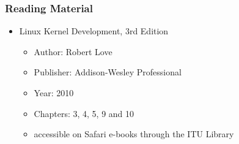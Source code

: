 \documentclass[dvipsnames]{beamer}
\begin{document}
\begin{frame}
  \frametitle{Reading Material}
  \begin{itemize}
    \item Linux Kernel Development, 3rd Edition
    \begin{itemize}
      \item Author: Robert Love
      \item Publisher: Addison-Wesley Professional
      \item Year: 2010
      \item Chapters: \alert{3}, \alert{4}, 5, 9 and 10
      \item accessible on Safari e-books through the ITU Library
    \end{itemize}
  \end{itemize}
\end{frame}
\end{document}
